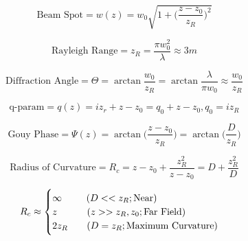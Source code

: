 \documentclass[aps,twoside,secnumarabic,balancelastpage,amsmath,amssymb,nofootinbib,hyperref=pdftex]{revtex4}
\newcommand\tab[1][3mm]{\hspace*{#1}}
\begin{document}
\begin{equation}
\text{Beam Spot}
= w(z)
 = w_0 \sqrt{1 + \big( \frac{z-z_0}{z_R} \big)^2}
\end{equation}

\begin{equation}
\text{Rayleigh Range}
= z_R = \frac{\pi w_0^2}{\lambda} \approx 3 m
\end{equation}

\begin{equation}
\text{Diffraction Angle}
= \Theta
 = \arctan \frac{w_0}{z_R} = \arctan \frac{\lambda}{\pi w_0} \approx \frac{w_0}{z_R}
\end{equation}

\begin{equation}
\text{q-param}
= q(z)
 = i z_r + z - z_0 = q_0 + z - z_0 , q_0 = i z_R
\end{equation}

\begin{equation}
\text{Gouy Phase}
= \Psi(z)
 = \arctan\Big( \frac{z-z_0}{z_R} \Big)
 = \arctan\Big( \frac{D}{z_R} \Big)
\end{equation}

\begin{equation}
\text{Radius of Curvature}
= R_c
 = z-z_0+ \frac{z_R^2}{z-z_0}
 = D + \frac{z_R^2}{D}
\end{equation}

\[
  R_c \approx \begin{cases}
               \infty \tab\tab\tab(D<<z_R ; \text{Near})\\
               z \tab\tab\tab\;\;(z>>z_R,z_0 ; \text{Far Field})\\
               2 z_R \tab\tab\;(D=z_R; \text{Maximum Curvature})
            \end{cases}
\]
\end{document}
